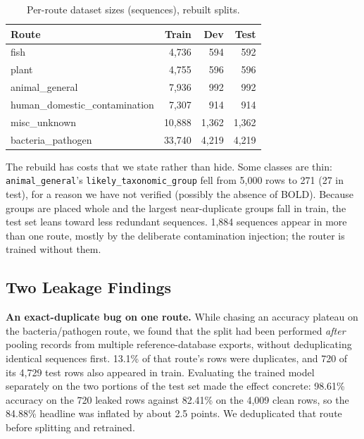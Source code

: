\documentclass[conference]{IEEEtran}
\begin{document}
\begin{table}[t]
\centering
\caption{Per-route dataset sizes (sequences), rebuilt splits.}
\label{tab:dataset}
\begin{tabular}{@{}lrrr@{}}
\toprule
Route & Train & Dev & Test \\
\midrule
fish & 4{,}736 & 594 & 592 \\
plant & 4{,}755 & 596 & 596 \\
animal\_general & 7{,}936 & 992 & 992 \\
human\_domestic\_contamination & 7{,}307 & 914 & 914 \\
misc\_unknown & 10{,}888 & 1{,}362 & 1{,}362 \\
bacteria\_pathogen & 33{,}740 & 4{,}219 & 4{,}219 \\
\bottomrule
\end{tabular}
\end{table}

The rebuild has costs that we state rather than hide. Some classes are thin: \texttt{animal\_general}'s \texttt{likely\_taxonomic\_group} fell from 5{,}000 rows to 271 (27 in test), for a reason we have not verified (possibly the absence of BOLD). Because groups are placed whole and the largest near-duplicate groups fall in train, the test set leans toward less redundant sequences. 1{,}884 sequences appear in more than one route, mostly by the deliberate contamination injection; the router is trained without them.

\subsection{Two Leakage Findings}
\label{sec:leakage}

\textbf{An exact-duplicate bug on one route.} While chasing an accuracy plateau on the bacteria/pathogen route, we found that the split had been performed \emph{after} pooling records from multiple reference-database exports, without deduplicating identical sequences first. 13.1\% of that route's rows were duplicates, and 720 of its 4{,}729 test rows also appeared in train. Evaluating the trained model separately on the two portions of the test set made the effect concrete: 98.61\% accuracy on the 720 leaked rows against 82.41\% on the 4{,}009 clean rows, so the 84.88\% headline was inflated by about 2.5 points. We deduplicated that route before splitting and retrained.
\end{document}
